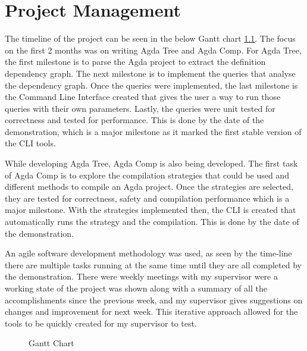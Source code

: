 
\chapter{Project Management}

The timeline of the project can be seen in the below Gantt chart
\ref{fig:Gantt}. The focus on the first 2 months was on writing Agda Tree and
Agda Comp. For Agda Tree, the first milestone is to parse the Agda project to
extract the definition dependency graph. The next milestone is to implement the
queries that analyse the dependency graph. Once the queries were implemented,
the last milestone is the Command Line Interface created that gives the user a
way to run those queries with their own parameters. Lastly, the queries were
unit tested for correctness and tested for performance. This is done by the
date of the demonstration, which is a major milestone as it marked the first
stable version of the CLI tools.

While developing Agda Tree, Agda Comp is also being developed. The first task
of Agda Comp is to explore the compilation strategies that could be used and
different methods to compile an Agda project. Once the strategies are selected,
they are tested for correctness, safety and compilation performance which is a
major milestone. With the strategies implemented then, the CLI is created that
automatically runs the strategy and the compilation. This is done by the date
of the demonstration.

An agile software development methodology was used, as seen by the time-line
there are multiple tasks running at the same time until they are all completed
by the demonstration. There were weekly meetings with my supervisor were a
working state of the project was shown along with a summary of all the
accomplishments since the previous week, and my supervisor gives suggestions on
changes and improvement for next week. This iterative approach allowed for the
tools to be quickly created for my supervisor to test.

\begin{figure}[H]
    \centering
    \label{fig:Gantt}
    \caption{Gantt Chart}
\end{figure} 


